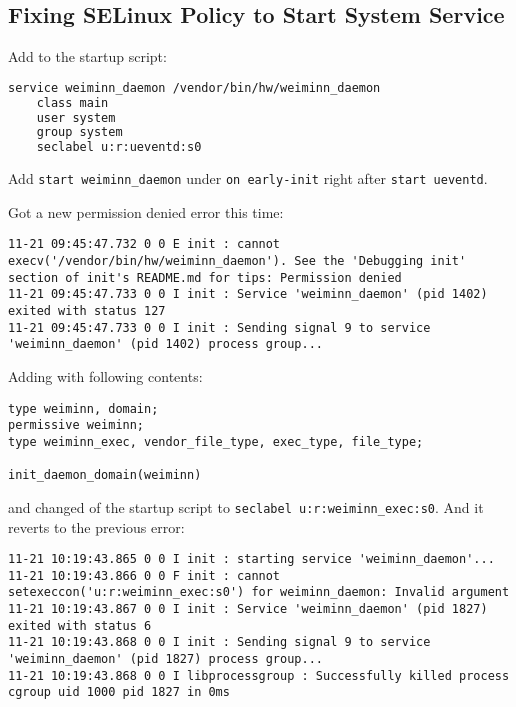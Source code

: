 \subsection{Fixing SELinux Policy to Start System Service}
\label{task:20231121_aosp}


Add  to the startup script:
\begin{lstlisting}[language=sh]
service weiminn_daemon /vendor/bin/hw/weiminn_daemon
    class main
    user system
    group system
    seclabel u:r:ueventd:s0
\end{lstlisting}
Add \texttt{start weiminn\_daemon} under \texttt{on early-init} right after \texttt{start ueventd}.

Got a new permission denied error this time:
\begin{lstlisting}
11-21 09:45:47.732 0 0 E init : cannot execv('/vendor/bin/hw/weiminn_daemon'). See the 'Debugging init' section of init's README.md for tips: Permission denied
11-21 09:45:47.733 0 0 I init : Service 'weiminn_daemon' (pid 1402) exited with status 127
11-21 09:45:47.733 0 0 I init : Sending signal 9 to service 'weiminn_daemon' (pid 1402) process group...    
\end{lstlisting}

Adding  with following contents:
\begin{lstlisting}
type weiminn, domain; 
permissive weiminn;
type weiminn_exec, vendor_file_type, exec_type, file_type; 

init_daemon_domain(weiminn)     
\end{lstlisting}
and changed  of the startup script to \texttt{seclabel u:r:weiminn\_exec:s0}. And it reverts to the previous error:
\begin{lstlisting}
11-21 10:19:43.865 0 0 I init : starting service 'weiminn_daemon'...
11-21 10:19:43.866 0 0 F init : cannot setexeccon('u:r:weiminn_exec:s0') for weiminn_daemon: Invalid argument
11-21 10:19:43.867 0 0 I init : Service 'weiminn_daemon' (pid 1827) exited with status 6
11-21 10:19:43.868 0 0 I init : Sending signal 9 to service 'weiminn_daemon' (pid 1827) process group...
11-21 10:19:43.868 0 0 I libprocessgroup : Successfully killed process cgroup uid 1000 pid 1827 in 0ms
    
\end{lstlisting}